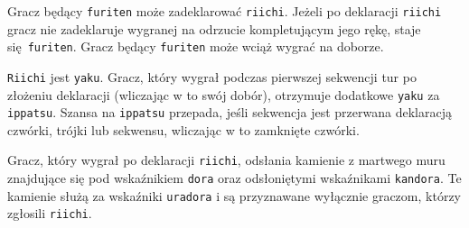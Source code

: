Gracz będący \texttt{furiten} może zadeklarować \texttt{riichi}.
Jeżeli po deklaracji \texttt{riichi} gracz nie zadeklaruje wygranej na odrzucie
kompletującym jego rękę, staje się \texttt{furiten}.
Gracz będący \texttt{furiten} może wciąż wygrać na doborze.

\texttt{Riichi} jest \texttt{yaku}.
Gracz, który wygrał podczas pierwszej sekwencji tur po złożeniu deklaracji
(wliczając w to swój dobór), otrzymuje dodatkowe \texttt{yaku} za
\texttt{ippatsu}.
Szansa na \texttt{ippatsu} przepada, jeśli sekwencja jest przerwana deklaracją
czwórki, trójki lub sekwensu, wliczając w to zamknięte czwórki.

Gracz, który wygrał po deklaracji \texttt{riichi}, odsłania kamienie z martwego
muru znajdujące się pod wskaźnikiem \texttt{dora} oraz odsłoniętymi wskaźnikami
\texttt{kandora}.
Te kamienie służą za wskaźniki \texttt{uradora} i są przyznawane wyłącznie
graczom, którzy zgłosili \texttt{riichi}.

